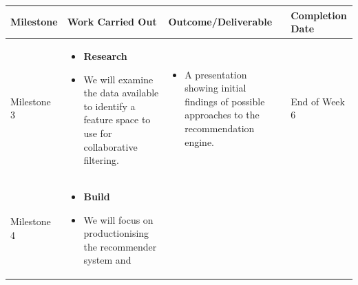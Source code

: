\documentclass[
]{book}
\providecommand{\tightlist}{%
  \setlength{\itemsep}{0pt}\setlength{\parskip}{0pt}}
\begin{document}
\begin{smaller}

\begin{longtable}[]{@{}llll@{}}
\toprule
\begin{minipage}[b]{0.14\columnwidth}\raggedright
Milestone\strut
\end{minipage} & \begin{minipage}[b]{0.30\columnwidth}\raggedright
Work Carried Out\strut
\end{minipage} & \begin{minipage}[b]{0.30\columnwidth}\raggedright
Outcome/Deliverable\strut
\end{minipage} & \begin{minipage}[b]{0.15\columnwidth}\raggedright
Completion Date\strut
\end{minipage}\tabularnewline
\midrule
\endhead
\begin{minipage}[t]{0.14\columnwidth}\raggedright
Milestone 3\strut
\end{minipage} & \begin{minipage}[t]{0.30\columnwidth}\raggedright
\begin{itemize}
\tightlist
\item
  \textbf{Research}
\item
  We will examine the data available to identify a feature space to use
  for collaborative filtering.
\end{itemize}\strut
\end{minipage} & \begin{minipage}[t]{0.30\columnwidth}\raggedright
\begin{itemize}
\tightlist
\item
  A presentation showing initial findings of possible approaches to the
  recommendation engine.
\end{itemize}\strut
\end{minipage} & \begin{minipage}[t]{0.15\columnwidth}\raggedright
End of Week 6\strut
\end{minipage}\tabularnewline
\begin{minipage}[t]{0.14\columnwidth}\raggedright
Milestone 4\strut
\end{minipage} & \begin{minipage}[t]{0.30\columnwidth}\raggedright
\begin{itemize}
\tightlist
\item
  \textbf{Build}
\item
  We will focus on productionising the recommender system and

\end{itemize}
\end{minipage}
\end{longtable}
\end{smaller}
\end{document}
